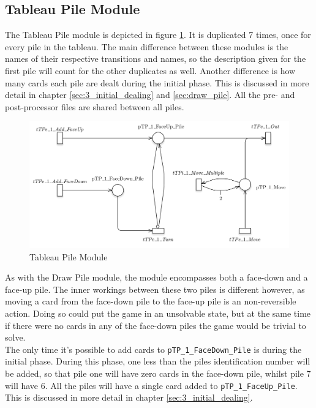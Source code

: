 \documentclass[runningheads,a4paper]{llncs}
\begin{document}
\subsection{Tableau Pile Module}
The Tableau Pile module is depicted in figure \ref{fig:tableau_pile}. It is duplicated 7 times, once for every pile in the tableau. The main difference between these modules is the names of their respective transitions and names, so the description given for the first pile will count for the other duplicates as well. Another difference is how many cards each pile are dealt during the initial phase. This is discussed in more detail in chapter \ref{sec:3_initial_dealing} and \ref{sec:draw_pile}. All the pre- and post-processor files are shared between all piles.
\begin{figure}
	\begin{center}
		\includegraphics[width=\textwidth]{images/tableauPile}
		\caption{Tableau Pile Module}
		\label{fig:tableau_pile}
	\end{center}
\end{figure}

As with the Draw Pile module, the module encompasses both a face-down and a face-up pile. The inner workings between these two piles is different however, as moving a card from the face-down pile to the face-up pile is an non-reversible action. Doing so could put the game in an unsolvable state, but at the same time if there were no cards in any of the face-down piles the game would be trivial to solve. \\

The only time it's possible to add cards to \verb!pTP_1_FaceDown_Pile! is during the initial phase. During this phase, one less than the piles identification number will be added, so that pile one will have zero cards in the face-down pile, whilst pile 7 will have 6. All the piles will have a single card added to \verb!pTP_1_FaceUp_Pile!. This is discussed in more detail in chapter \ref{sec:3_initial_dealing}. \\
\end{document}
